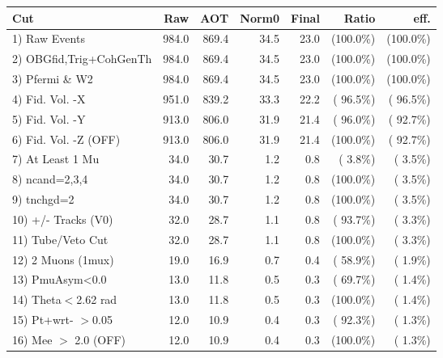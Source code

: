  \begin{table}[h!]\centering
 \begin{tabular}{||l||r|r|r|r|r|r||}
 \hline
 \hline
 Cut & Raw & AOT & Norm0 & Final & Ratio & eff.       \\
 \hline
  1) Raw Events           &        984.0 &        869.4 &         34.5 &         23.0 & (100.0\%) & (100.0\%) \\
  2) OBGfid,Trig+CohGenTh &        984.0 &        869.4 &         34.5 &         23.0 & (100.0\%) & (100.0\%) \\
  3) Pfermi \& W2         &        984.0 &        869.4 &         34.5 &         23.0 & (100.0\%) & (100.0\%) \\
  4) Fid. Vol. -X         &        951.0 &        839.2 &         33.3 &         22.2 & ( 96.5\%) & ( 96.5\%) \\
  5) Fid. Vol. -Y         &        913.0 &        806.0 &         31.9 &         21.4 & ( 96.0\%) & ( 92.7\%) \\
  6) Fid. Vol. -Z (OFF)   &        913.0 &        806.0 &         31.9 &         21.4 & (100.0\%) & ( 92.7\%) \\
  7) At Least 1 Mu        &         34.0 &         30.7 &          1.2 &          0.8 & (  3.8\%) & (  3.5\%) \\
  8) ncand=2,3,4          &         34.0 &         30.7 &          1.2 &          0.8 & (100.0\%) & (  3.5\%) \\
  9) tnchgd=2             &         34.0 &         30.7 &          1.2 &          0.8 & (100.0\%) & (  3.5\%) \\
 10) +/- Tracks (V0)      &         32.0 &         28.7 &          1.1 &          0.8 & ( 93.7\%) & (  3.3\%) \\
 11) Tube/Veto Cut        &         32.0 &         28.7 &          1.1 &          0.8 & (100.0\%) & (  3.3\%) \\
 12) 2 Muons (1mux)       &         19.0 &         16.9 &          0.7 &          0.4 & ( 58.9\%) & (  1.9\%) \\
 13) PmuAsym<0.0          &         13.0 &         11.8 &          0.5 &          0.3 & ( 69.7\%) & (  1.4\%) \\
 14) Theta$<$2.62 rad     &         13.0 &         11.8 &          0.5 &          0.3 & (100.0\%) & (  1.4\%) \\
 15) Pt+wrt- $>$0.05      &         12.0 &         10.9 &          0.4 &          0.3 & ( 92.3\%) & (  1.3\%) \\
 16) Mee $>$ 2.0  (OFF)   &         12.0 &         10.9 &          0.4 &          0.3 & (100.0\%) & (  1.3\%) \\

\end{tabular}
\end{table}
